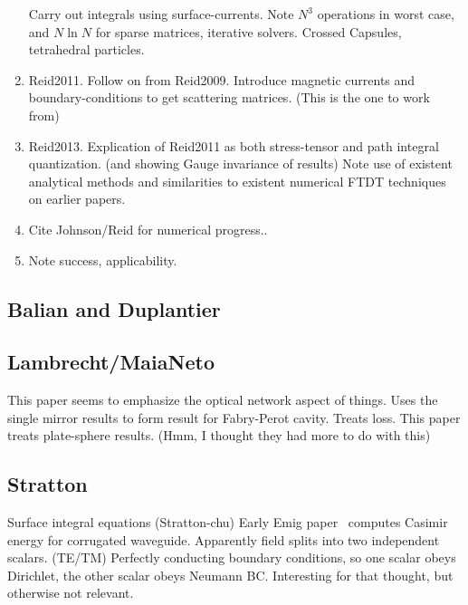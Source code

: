 \begin{enumerate}
Carry out integrals using surface-currents.  
Note $N^3$ operations in worst case, and $N\ln N$ for sparse matrices, iterative solvers.  
Crossed Capsules, tetrahedral particles.  \cite{Reid2009}
\item Reid2011.  Follow on from Reid2009.  Introduce magnetic currents and boundary-conditions to get scattering matrices.
(This is the one to work from)\cite{Reid2011}
\item Reid2013.  Explication of Reid2011 as both stress-tensor and path integral quantization.  (and showing
Gauge invariance of results)\cite{Reid2013}
\cite{Emig2004, Emig2007, Rahi2009}
\cite{Kenneth2006}
  Note use of existent analytical methods and similarities to existent 
  numerical FTDT techniques on earlier papers.  
  \cite{Rodriguez2007,Rodriguez2007a, Rodriguez2009}
\item Cite Johnson/Reid for numerical progress.\cite{Reid2009,Reid2011, Reid2013}.
\item Note success, applicability.  
\end{enumerate}




\subsection{Balian and Duplantier}
\cite{Balian1977} \cite{Balian1978}
\subsection{Lambrecht/MaiaNeto}

\cite{Lambrecht2006}
This paper seems to emphasize the optical network aspect of things.  
Uses the single mirror results to form result for Fabry-Perot cavity.
Treats loss.  
\cite{MaiaNeto2008}
This paper treats plate-sphere results.  (Hmm, I thought they had more to do with this)

\cite{Canaguier-Durand2012}

\subsection{Stratton}
Surface integral equations (Stratton-chu)
\cite{Stratton1941}
Early Emig paper~\cite{Emig2001} computes Casimir energy for corrugated waveguide.
Apparently field splits into two independent scalars.  (TE/TM)
Perfectly conducting boundary conditions, so one scalar obeys Dirichlet, 
the other scalar obeys Neumann BC.
 Interesting for that thought, but otherwise not relevant.  

